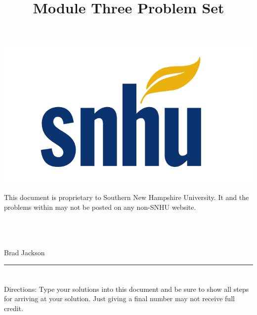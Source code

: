\documentclass{amsart}
\theoremstyle{definition}
\theoremstyle{Exercise}
\theoremstyle{remark}
\theoremstyle{rule}
\numberwithin{equation}{section}
\begin{document}
\begin{center}
\includegraphics[scale=.1]{snhu_logo.png}
\end{center}
\title{\sf Module Three Problem Set}%


\maketitle
This document is proprietary to Southern New Hampshire University. It and the problems within may not be posted on any non-SNHU website.\\\\\\\\
\begin{center}
Brad Jackson
\end{center}


\begin{center}
\rule{\textwidth}{0.4pt}
\end{center}


\newpage
\section*{}
\section*{}
Directions: Type your solutions into this document and be sure to show all steps for arriving at your solution. Just giving a final number may not receive full credit.
\\\\



\end{document}
